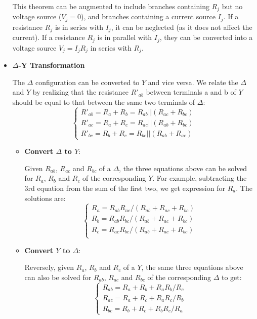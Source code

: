 \begin{itemize}
This theorem can be augmented to include branches containing $R_j$ but no
voltage source ($V_j=0$), and branches containing a current source $I_j$. If 
a resistance $R_j$ is in series with $I_j$, it can be neglected (as it does
not affect the current). If a resistance $R_j$ is in parallel with $I_j$, 
they can be converted into a voltage source $V_j=I_jR_j$ in series with $R_j$. 


\item {\bf $\Delta$-Y Transformation}


The $\Delta$ configuration can be converted to $Y$ and vice versa. We
relate the $\Delta$ and $Y$ by realizing that the resistance $R'_{ab}$
between terminals a and b of $Y$ should be equal to that between the
same two terminals of $\Delta$:
\[ \left\{ \begin{array}{rr}
	R'_{ab}=R_a+R_b=R_{ab}||(R_{ac}+R_{bc})	\\
	R'_{ac}=R_a+R_c=R_{ac}||(R_{ab}+R_{bc}) \\
	R'_{bc}=R_b+R_c=R_{bc}||(R_{ab}+R_{ac}) \end{array} \right. \]
\begin{itemize}
  \item {\bf Convert $\Delta$ to $Y$}: 

    Given $R_{ab}$, $R_{ac}$ and $R_{bc}$ of a $\Delta$, the three equations 
    above can be solved for $R_a$, $R_b$ and $R_c$ of the corresponding $Y$. 
    For example, subtracting the 3rd equation from the sum of the first two, 
    we get expression for $R_a$. The solutions are:
    \[ \left\{ \begin{array}{rr}
      R_a=R_{ab}R_{ac}/(R_{ab}+R_{ac}+R_{bc}) \\
      R_b=R_{ab}R_{bc}/(R_{ab}+R_{ac}+R_{bc}) \\
      R_c=R_{ac}R_{bc}/(R_{ab}+R_{ac}+R_{bc}) \\
    \end{array} \right. \]

  \item {\bf Convert $Y$ to $\Delta$}: 

    Reversely, given $R_a$, $R_b$ and $R_c$ of a $Y$, the same three 
    equations above can also be solved for $R_{ab}$, $R_{ac}$ and $R_{bc}$ 
    of the corresponding $\Delta$ to get:
    \[ \left\{ \begin{array}{rr}
      R_{ab}=R_a+R_b+R_aR_b/R_c	\\
      R_{ac}=R_a+R_c+R_aR_c/R_b	\\
      R_{bc}=R_b+R_c+R_bR_c/R_a	\end{array} \right. \]
\end{itemize}


\end{itemize}
